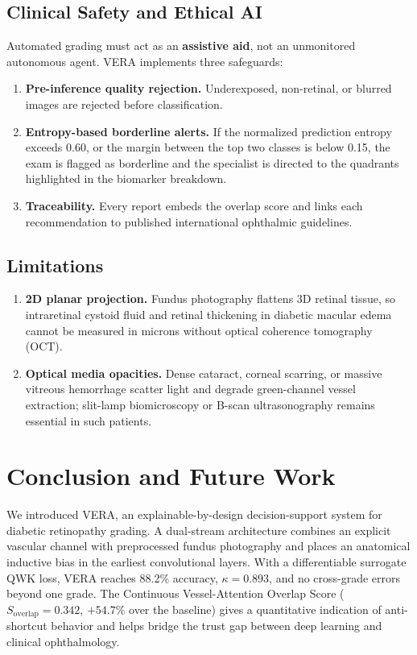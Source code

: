 \documentclass[conference]{IEEEtran}
\newcommand{\sov}{S_{\mathrm{overlap}}}
\begin{document}
\subsection{Clinical Safety and Ethical AI}
Automated grading must act as an \textbf{assistive aid}, not an unmonitored autonomous agent. VERA implements three safeguards:
\begin{enumerate}
\item \textbf{Pre-inference quality rejection.} Underexposed, non-retinal, or blurred images are rejected before classification.
\item \textbf{Entropy-based borderline alerts.} If the normalized prediction entropy exceeds 0.60, or the margin between the top two classes is below 0.15, the exam is flagged as borderline and the specialist is directed to the quadrants highlighted in the biomarker breakdown.
\item \textbf{Traceability.} Every report embeds the overlap score and links each recommendation to published international ophthalmic guidelines.
\end{enumerate}

\subsection{Limitations}
\begin{enumerate}
\item \textbf{2D planar projection.} Fundus photography flattens 3D retinal tissue, so intraretinal cystoid fluid and retinal thickening in diabetic macular edema cannot be measured in microns without optical coherence tomography (OCT).
\item \textbf{Optical media opacities.} Dense cataract, corneal scarring, or massive vitreous hemorrhage scatter light and degrade green-channel vessel extraction; slit-lamp biomicroscopy or B-scan ultrasonography remains essential in such patients.
\end{enumerate}

\section{Conclusion and Future Work}

We introduced VERA, an explainable-by-design decision-support system for diabetic retinopathy grading. A dual-stream architecture combines an explicit vascular channel with preprocessed fundus photography and places an anatomical inductive bias in the earliest convolutional layers. With a differentiable surrogate QWK loss, VERA reaches 88.2\% accuracy, $\kappa=0.893$, and no cross-grade errors beyond one grade. The Continuous Vessel-Attention Overlap Score ($\sov=0.342$, $+54.7\%$ over the baseline) gives a quantitative indication of anti-shortcut behavior and helps bridge the trust gap between deep learning and clinical ophthalmology.
\end{document}
